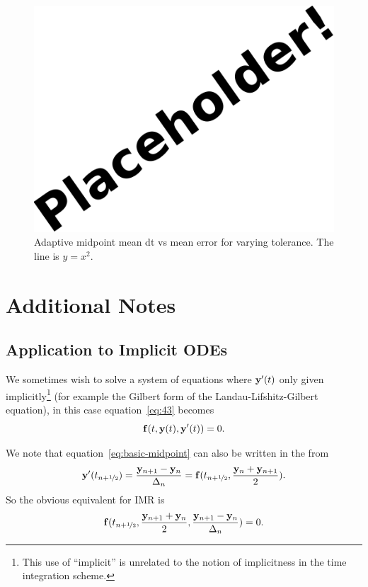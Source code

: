 \begin{figure}[ht!]
  \centering
  \includegraphics{images/placeholder}
  \caption{Adaptive midpoint mean dt vs mean error for varying tolerance. The line is $y = x^2$.}
  \label{fig:mp-tols}
\end{figure}


\section{Additional Notes}

\subsection{Application to Implicit ODEs}
\label{sec:extens-impl-odes}

We sometimes wish to solve a system of equations where $\mathbf{y}'(t)$ only given implicitly\footnote{This use of ``implicit'' is unrelated to the notion of implicitness in the time integration scheme.} (for example the Gilbert form of the Landau-Lifshitz-Gilbert equation), in this case equation~\eqref{eq:43} becomes
\begin{equation}
  {\mathbf{f}}(t, \mathbf{y}(t), \mathbf{y}'(t)) = 0.
\end{equation}

We note that equation~\eqref{eq:basic-midpoint} can also be written in the from
\begin{equation}
  \mathbf{y}'(t_{n+\nicefrac{1}{2}}) = \frac{\mathbf{y}_{n+1} - \mathbf{y}_n}{\Delta_{n}} =  {\mathbf{f}}(t_{n+\nicefrac{1}{2}}, \frac{\mathbf{y}_n + \mathbf{y}_{n+1}}{2}).
\end{equation}
So the obvious equivalent for IMR is
\begin{equation}
  {\mathbf{f}}(t_{n+\nicefrac{1}{2}}, \frac{\mathbf{y}_{n+1} + \mathbf{y}_n}{2}, \frac{\mathbf{y}_{n+1} - \mathbf{y}_n}{\Delta_{n}}) = 0.
\end{equation}

